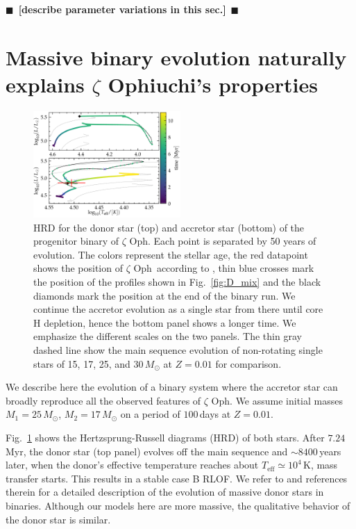 \documentclass[twocolumn,twocolappendix,trackchanges]{aastex63}
\DeclareRobustCommand{\Figref}[1]{Fig.~\ref{#1}}
\newcommand{\zoph}{$\zeta$ Oph}
\newcommand{\todo}[1]{{\large $\blacksquare$~\textbf{\color{red}[#1]}}~$\blacksquare$}
\begin{document}
\todo{describe parameter variations in this sec.}

\section{Massive binary evolution naturally explains $\zeta$
  Ophiuchi's properties}
\label{sec:best_model}

\begin{figure}[tbp]
  \includegraphics[width=0.5\textwidth]{HRD_both}
  \caption{HRD for the donor star (top) and accretor star (bottom) of
    the progenitor binary of \zoph. Each point is separated by 50
    years of evolution. The colors represent the
    stellar age, the red datapoint shows the position of \zoph\
    according to \cite{villamariz:05}, thin blue crosses mark the
    position of the profiles shown in \Figref{fig:D_mix} and the black diamonds mark the
    position at the end of the binary run. We continue the accretor
    evolution as a single star from there until core H depletion,
    hence the bottom panel shows a longer time. We emphasize the different
    scales on the two panels. The thin gray dashed line show the main
    sequence evolution of non-rotating single stars of 15, 17, 25, and
    30\,$M_\odot$ at $Z=0.01$ for comparison.}
  \label{fig:HRD_both}
\end{figure}


We describe here the evolution of a binary system where the accretor
star can broadly reproduce all the observed features of \zoph. We assume initial masses
$M_1=25\,M_\odot$, $M_2=17\,M_\odot$ on a period of $100$\,days at
$Z=0.01$.

\Figref{fig:HRD_both} shows the Hertzsprung-Russell diagrams (HRD)
of both stars. After $7.24$\,Myr, the donor star (top panel) evolves off the main
sequence and $\sim8400$\,years later, when the donor's effective
temperature reaches about $T_\mathrm{eff}\simeq 10^4$\,K, mass transfer starts. This
results in a stable case B RLOF. We refer to \cite{gotberg:17, laplace:21, blagorodnova:21}
and references therein for a detailed description of the evolution of
massive donor stars in binaries. Although our models here are
more massive, the qualitative behavior of the donor star is similar.
\end{document}
